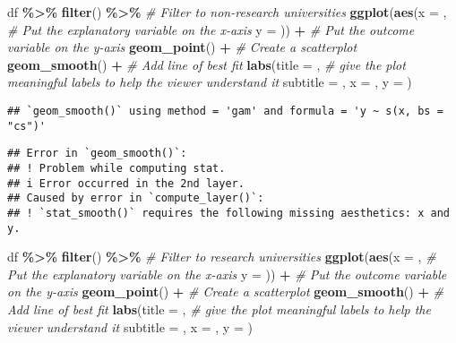 \documentclass[
]{article}
\newenvironment{Shaded}{\begin{snugshade}}{\end{snugshade}}
\newcommand{\AttributeTok}[1]{\textcolor[rgb]{0.13,0.29,0.53}{#1}}
\newcommand{\CommentTok}[1]{\textcolor[rgb]{0.56,0.35,0.01}{\textit{#1}}}
\newcommand{\FunctionTok}[1]{\textcolor[rgb]{0.13,0.29,0.53}{\textbf{#1}}}
\newcommand{\NormalTok}[1]{#1}
\newcommand{\SpecialCharTok}[1]{\textcolor[rgb]{0.81,0.36,0.00}{\textbf{#1}}}
\newcommand{\StringTok}[1]{\textcolor[rgb]{0.31,0.60,0.02}{#1}}
\begin{document}
\begin{Shaded}
\begin{Highlighting}[]
\NormalTok{df }\SpecialCharTok{\%\textgreater{}\%}
  \FunctionTok{filter}\NormalTok{() }\SpecialCharTok{\%\textgreater{}\%} \CommentTok{\# Filter to non{-}research universities}
  \FunctionTok{ggplot}\NormalTok{(}\FunctionTok{aes}\NormalTok{(}\AttributeTok{x =}\NormalTok{ , }\CommentTok{\# Put the explanatory variable on the x{-}axis}
             \AttributeTok{y =}\NormalTok{ )) }\SpecialCharTok{+}  \CommentTok{\# Put the outcome variable on the y{-}axis}
  \FunctionTok{geom\_point}\NormalTok{() }\SpecialCharTok{+} \CommentTok{\# Create a scatterplot}
  \FunctionTok{geom\_smooth}\NormalTok{() }\SpecialCharTok{+} \CommentTok{\# Add line of best fit}
  \FunctionTok{labs}\NormalTok{(}\AttributeTok{title =} \StringTok{\textquotesingle{}\textquotesingle{}}\NormalTok{, }\CommentTok{\# give the plot meaningful labels to help the viewer understand it}
       \AttributeTok{subtitle =} \StringTok{\textquotesingle{}\textquotesingle{}}\NormalTok{, }
       \AttributeTok{x =} \StringTok{\textquotesingle{}\textquotesingle{}}\NormalTok{,}
       \AttributeTok{y =} \StringTok{\textquotesingle{}\textquotesingle{}}\NormalTok{)}
\end{Highlighting}
\end{Shaded}

\begin{verbatim}
## `geom_smooth()` using method = 'gam' and formula = 'y ~ s(x, bs = "cs")'
\end{verbatim}

\begin{verbatim}
## Error in `geom_smooth()`:
## ! Problem while computing stat.
## i Error occurred in the 2nd layer.
## Caused by error in `compute_layer()`:
## ! `stat_smooth()` requires the following missing aesthetics: x and y.
\end{verbatim}

\begin{Shaded}
\begin{Highlighting}[]
\NormalTok{df }\SpecialCharTok{\%\textgreater{}\%}
  \FunctionTok{filter}\NormalTok{() }\SpecialCharTok{\%\textgreater{}\%} \CommentTok{\# Filter to research universities}
  \FunctionTok{ggplot}\NormalTok{(}\FunctionTok{aes}\NormalTok{(}\AttributeTok{x =}\NormalTok{ , }\CommentTok{\# Put the explanatory variable on the x{-}axis}
             \AttributeTok{y =}\NormalTok{ )) }\SpecialCharTok{+}  \CommentTok{\# Put the outcome variable on the y{-}axis}
  \FunctionTok{geom\_point}\NormalTok{() }\SpecialCharTok{+} \CommentTok{\# Create a scatterplot}
  \FunctionTok{geom\_smooth}\NormalTok{() }\SpecialCharTok{+} \CommentTok{\# Add line of best fit}
  \FunctionTok{labs}\NormalTok{(}\AttributeTok{title =} \StringTok{\textquotesingle{}\textquotesingle{}}\NormalTok{, }\CommentTok{\# give the plot meaningful labels to help the viewer understand it}
       \AttributeTok{subtitle =} \StringTok{\textquotesingle{}\textquotesingle{}}\NormalTok{, }
       \AttributeTok{x =} \StringTok{\textquotesingle{}\textquotesingle{}}\NormalTok{,}
       \AttributeTok{y =} \StringTok{\textquotesingle{}\textquotesingle{}}\NormalTok{)}
\end{Highlighting}
\end{Shaded}
\end{document}

